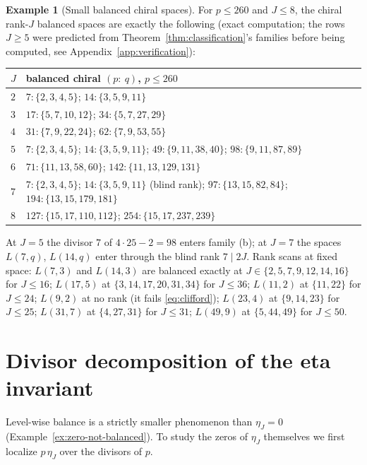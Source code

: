 \documentclass[11pt]{article}
\theoremstyle{definition}
\newtheorem{example}[theorem]{Example}
\begin{document}
\begin{example}[Small balanced chiral spaces]
\label{ex:balanced-table}
For $p\leq260$ and $J\leq8$, the chiral rank-$J$ balanced spaces are
exactly the following (exact computation; the rows $J\geq5$ were
predicted from Theorem~\ref{thm:classification}'s families before being
computed, see Appendix~\ref{app:verification}):
\begin{center}
\begin{tabular}{@{}ll@{}}
\toprule
$J$ & balanced chiral $(p:\ q)$, $p\leq260$\\
\midrule
$2$ & $7{:}\{2,3,4,5\}$; $14{:}\{3,5,9,11\}$\\
$3$ & $17{:}\{5,7,10,12\}$; $34{:}\{5,7,27,29\}$\\
$4$ & $31{:}\{7,9,22,24\}$; $62{:}\{7,9,53,55\}$\\
$5$ & $7{:}\{2,3,4,5\}$; $14{:}\{3,5,9,11\}$; $49{:}\{9,11,38,40\}$; $98{:}\{9,11,87,89\}$\\
$6$ & $71{:}\{11,13,58,60\}$; $142{:}\{11,13,129,131\}$\\
$7$ & $7{:}\{2,3,4,5\}$; $14{:}\{3,5,9,11\}$ (blind rank); $97{:}\{13,15,82,84\}$; $194{:}\{13,15,179,181\}$\\
$8$ & $127{:}\{15,17,110,112\}$; $254{:}\{15,17,237,239\}$\\
\bottomrule
\end{tabular}
\end{center}
At $J=5$ the divisor $7$ of $4\cdot25-2=98$ enters family (b); at $J=7$
the spaces $L(7,q)$, $L(14,q)$ enter through the blind rank $7\mid2J$.
Rank scans at fixed space: $L(7,3)$ and $L(14,3)$ are balanced exactly
at $J\in\{2,5,7,9,12,14,16\}$ for $J\leq16$; $L(17,5)$ at
$\{3,14,17,20,31,34\}$ for $J\leq36$; $L(11,2)$ at $\{11,22\}$ for
$J\leq24$; $L(9,2)$ at no rank (it fails \eqref{eq:clifford});
$L(23,4)$ at $\{9,14,23\}$ for $J\leq25$; $L(31,7)$ at $\{4,27,31\}$ for
$J\leq31$;
$L(49,9)$ at $\{5,44,49\}$ for $J\leq50$.
\end{example}

\section{Divisor decomposition of the eta invariant}
\label{sec:decomposition}

Level-wise balance is a strictly smaller phenomenon than $\eta_J=0$
(Example~\ref{ex:zero-not-balanced}).  To study the zeros of $\eta_J$
themselves we first localize $p\,\eta_J$ over the divisors of $p$.
\end{document}

